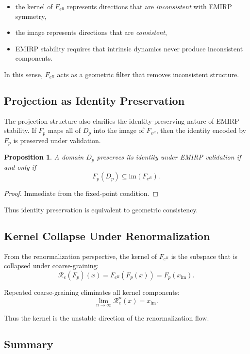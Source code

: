 \documentclass[11pt]{article}
\theoremstyle{definition}
\theoremstyle{plain}
\newtheorem{proposition}[definition]{Proposition}
\theoremstyle{remark}
\begin{document}
\begin{itemize}
    \item the kernel of $F_{e^R}$ represents directions that are
    \emph{inconsistent} with EMIRP symmetry,
    \item the image represents directions that are \emph{consistent},
    \item EMIRP stability requires that intrinsic dynamics never produce
    inconsistent components.
\end{itemize}

In this sense, $F_{e^R}$ acts as a geometric filter that removes
inconsistent structure.

\subsection{Projection as Identity Preservation}

The projection structure also clarifies the identity-preserving nature
of EMIRP stability. If $F_p$ maps all of $D_p$ into the image of
$F_{e^R}$, then the identity encoded by $F_p$ is preserved under
validation.

\begin{proposition}
A domain $D_p$ preserves its identity under EMIRP validation if and only
if
\[
F_p(D_p) \subseteq \mathrm{im}(F_{e^R}).
\]
\end{proposition}

\begin{proof}
Immediate from the fixed-point condition.
\end{proof}

Thus identity preservation is equivalent to geometric consistency.

\subsection{Kernel Collapse Under Renormalization}

From the renormalization perspective, the kernel of $F_{e^R}$ is the
subspace that is collapsed under coarse-graining:
\[
\mathcal{R}_e(F_p)(x) = F_{e^R}(F_p(x)) = F_p(x_{\mathrm{im}}).
\]

Repeated coarse-graining eliminates all kernel components:
\[
\lim_{n \to \infty} \mathcal{R}_e^n(x) = x_{\mathrm{im}}.
\]

Thus the kernel is the unstable direction of the renormalization flow.

\subsection{Summary}
\end{document}
